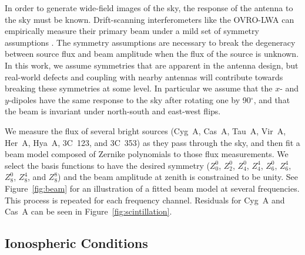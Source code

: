 \documentclass[twocolumn]{aastex61}
\begin{document}
In order to generate wide-field images of the sky, the response of the antenna to the sky must be
known. Drift-scanning interferometers like the OVRO-LWA can empirically measure their primary beam
under a mild set of symmetry assumptions \citep{2012AJ....143...53P}. The symmetry assumptions are
necessary to break the degeneracy between source flux and beam amplitude when the flux of the source
is unknown. In this work, we assume symmetries that are apparent in the antenna design, but
real-world defects and coupling with nearby antennas will contribute towards breaking these
symmetries at some level. In particular we assume that the $x$- and $y$-dipoles have the same
response to the sky after rotating one by 90$^\circ$, and that the beam is invariant under
north-south and east-west flips.

We measure the flux of several bright sources (Cyg~A, Cas~A, Tau~A, Vir~A, Her~A, Hya~A, 3C~123, and
3C~353) as they pass through the sky, and then fit a beam model composed of Zernike polynomials to
those flux measurements. We select the basis functions to have the desired symmetry ($Z_0^0$,
$Z_2^0$, $Z_4^0$, $Z_4^4$, $Z_6^0$, $Z_6^4$, $Z_8^0$, $Z_8^4$, and $Z_8^8$) and the beam amplitude
at zenith is constrained to be unity. See Figure~\ref{fig:beam} for an illustration of a fitted beam
model at several frequencies. This process is repeated for each frequency channel. Residuals for
Cyg~A and Cas~A can be seen in Figure~\ref{fig:scintillation}.

\subsection{Ionospheric Conditions}
\end{document}
